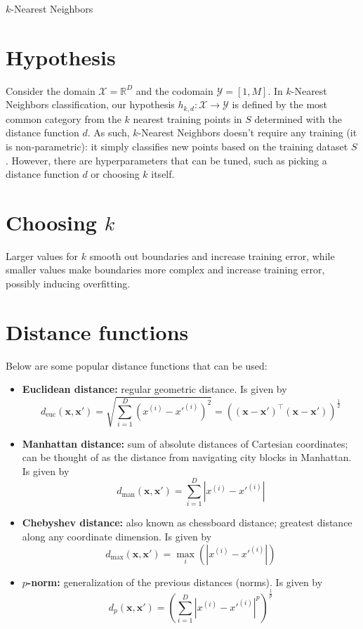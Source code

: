 \documentclass[12pt]{article}
\newcommand{\paren}[1]{\left(#1\right)}
\begin{document}
\begin{center}
	\LARGE{$k$-Nearest Neighbors}
\end{center}

\section{Hypothesis}

Consider the domain $\mathcal{X} = \mathbb{R}^D$ and the codomain  $\mathcal{Y} =[1, M]$. In $k$-Nearest Neighbors classification, our hypothesis $h_{k,d} : \mathcal{X} \rightarrow \mathcal{Y}$ is defined by the most common category from the $k$ nearest training points in $S$ determined with the distance function $d$. As such, $k$-Nearest Neighbors doesn't require any training (it is non-parametric): it simply classifies new points based on the training dataset $S$. However,  there are hyperparameters that can be tuned, such as picking a distance function $d$ or choosing $k$ itself.

\section{Choosing $k$}

Larger values for $k$ smooth out  boundaries and increase training error, while smaller values make boundaries more complex and increase training error, possibly inducing overfitting.

\section{Distance functions}

Below are some popular distance functions that can be used:
\begin{itemize}
	\item \textbf{Euclidean distance:} regular geometric distance. Is given by
	\[ d_\text{euc}(\mathbf{x}, \mathbf{x}') = \sqrt{\sum_{i=1}^D(x^{(i)} - x'^{(i)})^2} = ((\mathbf{x} - \mathbf{x}')^\top(\mathbf{x} - \mathbf{x}'))^\frac{1}{2} \]
	\item \textbf{Manhattan distance:} sum of absolute distances of Cartesian coordinates; can be thought of as the distance from navigating city blocks in Manhattan. Is given by
	\[ d_\text{man}(\mathbf{x}, \mathbf{x}') = \sum_{i=1}^{D}|x^{(i)} - x'^{(i)}| \]
	\item \textbf{Chebyshev distance:} also known as chessboard distance; greatest distance along any coordinate dimension. Is given by
	\[ d_\text{max}(\mathbf{x}, \mathbf{x}') = \max_i(|x^{(i)} - x'^{(i)}|) \]
	\item \textbf{$p$-norm:} generalization of the previous distances (norms). Is given by
	\[ d_p(\mathbf{x}, \mathbf{x}') = \paren{\sum_{i=1}^D|x^{(i)} - x'^{(i)}|^p}^\frac{1}{p} \]
\end{itemize}
\end{document}

